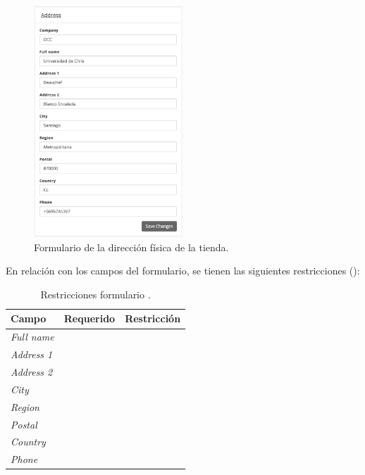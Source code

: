 \begin{figure}[H]
	\centering
	\includegraphics[width=0.5\textwidth]{figuras/dashboard/ecommerce/address/menu.png}
	\caption{Formulario de la dirección física de la tienda.}
	\label{figure:dashboard:ecommerce:address:menu}
\end{figure}

En relación con los campos del formulario, se tienen las siguientes restricciones ():

\begin{table}[H]
    \centering
	\begin{tabular}{ |l|c||l| }
		\hline Campo & Requerido & Restricción \\ \hline
		\multirow{1}{*}{\textit{Full name}} &  {\checkmark} &  \\ \hline
		\multirow{1}{*}{\textit{Address 1}} &  {\checkmark} &  \\ \hline
		\multirow{1}{*}{\textit{Address 2}} &   			&  \\ \hline
		\multirow{1}{*}{\textit{City}} 		&  {\checkmark} &  \\ \hline
		\multirow{1}{*}{\textit{Region}} 	&  {\checkmark} &  \\ \hline
		\multirow{1}{*}{\textit{Postal}} 	&  {\checkmark} &  \\ \hline
		\multirow{1}{*}{\textit{Country}}	&  {\checkmark} &  \\ \hline
		\multirow{1}{*}{\textit{Phone}} 	&  {\checkmark} &  \\ \hline
	\end{tabular}
 	\caption{Restricciones formulario \addressPanel.}
    \label{tab:dashboard:ecommerce:form:address}
\end{table}



